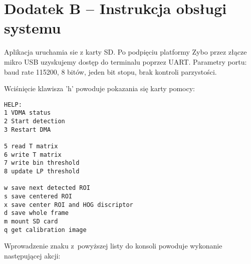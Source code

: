 \chapter{Dodatek B -- Instrukcja obsługi systemu}


Aplikacja uruchamia sie z karty SD. Po podpięciu platformy Zybo przez złącze mikro USB uzyskujemy dostęp do terminalu poprzez UART. 
Parametry portu: baud rate 115200, 8 bitów, jeden bit stopu, brak kontroli parzystości.

Wciśnięcie klawisza 'h' powoduje pokazania się karty pomocy:

\begin{lstlisting}
HELP:
1 VDMA status
2 Start detection
3 Restart DMA

5 read T matrix
6 write T matrix
7 write bin threshold
8 update LP threshold

w save next detected ROI
s save centered ROI
x save center ROI and HOG discriptor
d save whole frame
m mount SD card
q get calibration image

\end{lstlisting}
 
\noindent Wprowadzenie znaku z~powyższej listy do konsoli powoduje wykonanie następującej akcji:
 

